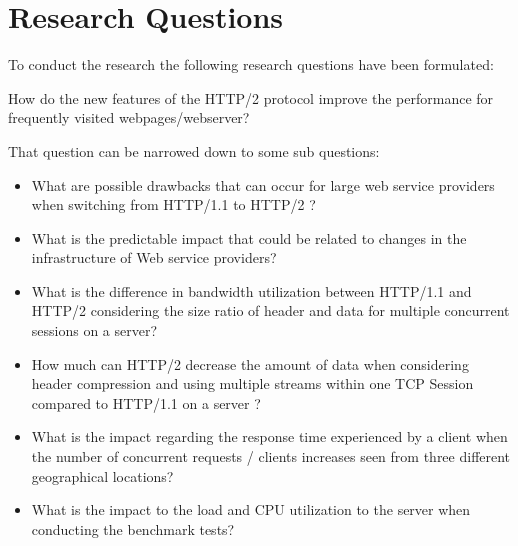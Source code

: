 \section{Research Questions}
\label{chap:rq}
To conduct the research the following research questions have been formulated:

How do the new features of the  HTTP/2 protocol improve the performance for frequently visited webpages/webserver?

That question can be narrowed down to some sub questions:

\begin{itemize}
\item What are possible drawbacks that can occur for large web service providers when switching from HTTP/1.1 to HTTP/2 ?
\item What is the predictable impact that could be related to changes in the infrastructure of Web service providers?
\item What is the difference in bandwidth utilization between HTTP/1.1 and HTTP/2 considering the size ratio of header and data for multiple concurrent sessions on a server?
\item How much can HTTP/2 decrease the amount of data when considering header compression and using multiple streams within one TCP Session compared to HTTP/1.1 on a server ?
\item What is the impact regarding the response time experienced by a client when the number of concurrent requests / clients increases seen from three different geographical locations?
\item What is the impact to the load and CPU utilization to the server when conducting the benchmark tests?
\end{itemize}